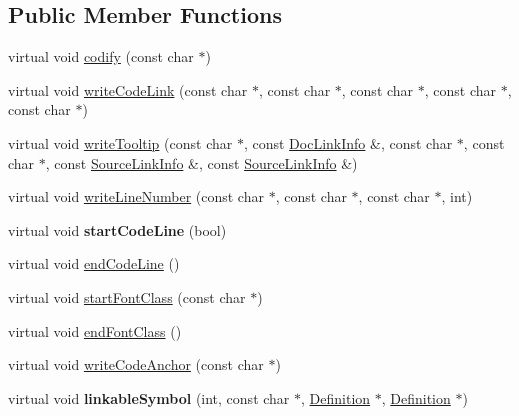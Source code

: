 \subsection*{Public Member Functions}
\begin{DoxyCompactItemize}
\item 
virtual void \mbox{\hyperlink{class_dev_null_code_doc_interface_a75e60fd56c45e70af39b3b926e76d53f}{codify}} (const char $\ast$)
\item 
virtual void \mbox{\hyperlink{class_dev_null_code_doc_interface_a44ad7fe7fba94cb200fd0d53642b1909}{write\+Code\+Link}} (const char $\ast$, const char $\ast$, const char $\ast$, const char $\ast$, const char $\ast$)
\item 
virtual void \mbox{\hyperlink{class_dev_null_code_doc_interface_a3f251d7e2651aa943adf84c35e27d094}{write\+Tooltip}} (const char $\ast$, const \mbox{\hyperlink{struct_doc_link_info}{Doc\+Link\+Info}} \&, const char $\ast$, const char $\ast$, const \mbox{\hyperlink{struct_source_link_info}{Source\+Link\+Info}} \&, const \mbox{\hyperlink{struct_source_link_info}{Source\+Link\+Info}} \&)
\item 
virtual void \mbox{\hyperlink{class_dev_null_code_doc_interface_a32188c740a455bab278f9098212b8fec}{write\+Line\+Number}} (const char $\ast$, const char $\ast$, const char $\ast$, int)
\item 
\mbox{\label{class_dev_null_code_doc_interface_a3a63c468ba7f134f5f5cfc5867a81e3a}} 
virtual void {\bfseries start\+Code\+Line} (bool)
\item 
virtual void \mbox{\hyperlink{class_dev_null_code_doc_interface_a5aeb9fdbb29f60058c55adecefab457a}{end\+Code\+Line}} ()
\item 
virtual void \mbox{\hyperlink{class_dev_null_code_doc_interface_a8489329a11f50e9d9ab1a3a67d306a51}{start\+Font\+Class}} (const char $\ast$)
\item 
virtual void \mbox{\hyperlink{class_dev_null_code_doc_interface_adb2939da13563e88a225059de3d767e5}{end\+Font\+Class}} ()
\item 
virtual void \mbox{\hyperlink{class_dev_null_code_doc_interface_abfa6f09f69831c231f0fe7bb095b8fc4}{write\+Code\+Anchor}} (const char $\ast$)
\item 
\mbox{\label{class_dev_null_code_doc_interface_a1d33f0e7e7ef04490c9c5f4feb0f89dd}} 
virtual void {\bfseries linkable\+Symbol} (int, const char $\ast$, \mbox{\hyperlink{class_definition}{Definition}} $\ast$, \mbox{\hyperlink{class_definition}{Definition}} $\ast$)

\end{DoxyCompactItemize}
